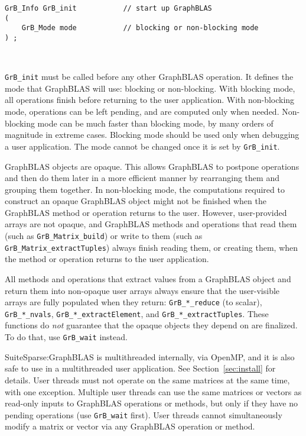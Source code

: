 \documentclass[12pt]{article}
\begin{document}
{\begin{mdframed}[userdefinedwidth=6in]
{\footnotesize
\begin{verbatim}
GrB_Info GrB_init           // start up GraphBLAS
(
    GrB_Mode mode           // blocking or non-blocking mode
) ;
\end{verbatim}
}\end{mdframed}

\hypertarget{link:init}{\mbox{ }}%
\verb'GrB_init' must be called before any other GraphBLAS operation.  It
defines the mode that GraphBLAS will use:  blocking or non-blocking.  With
blocking mode, all operations finish before returning to the user application.
With non-blocking mode, operations can be left pending, and are computed only
when needed.  Non-blocking mode can be much faster than blocking mode, by many
orders of magnitude in extreme cases.  Blocking mode should be used only when
debugging a user application.  The mode cannot be changed once it is set by
\verb'GrB_init'.

GraphBLAS objects are opaque.  This allows GraphBLAS to
postpone operations and then do them later in a more efficient manner by
rearranging them and grouping them together.  In non-blocking mode, the
computations required to construct an opaque GraphBLAS object might not be
finished when the GraphBLAS method or operation returns to the user.  However,
user-provided arrays are not opaque, and GraphBLAS methods and operations that
read them (such as \verb'GrB_Matrix_build') or write to them (such as
\verb'GrB_Matrix_extractTuples') always finish reading them, or creating them,
when the method or operation returns to the user application.

All methods and operations that extract values from a GraphBLAS object and
return them into non-opaque user arrays always ensure that the user-visible
arrays are fully populated when they return: \verb'GrB_*_reduce' (to scalar),
\verb'GrB_*_nvals', \verb'GrB_*_extractElement', and
\verb'GrB_*_extractTuples'.  These functions do {\em not} guarantee that the
opaque objects they depend on are finalized.  To do that, use
\verb'GrB_wait' instead.

SuiteSparse:GraphBLAS is multithreaded internally, via OpenMP, and it is also
safe to use in a multithreaded user application.  See Section~\ref{sec:install}
for details.
User threads must not operate on the same matrices at the same time, with one
exception.  Multiple user threads can use the same matrices or vectors as
read-only inputs to GraphBLAS operations or methods, but only if they have no
pending operations (use \verb'GrB_wait'
first).  User threads cannot simultaneously modify a matrix or vector via any
GraphBLAS operation or method.

}
\end{document}
